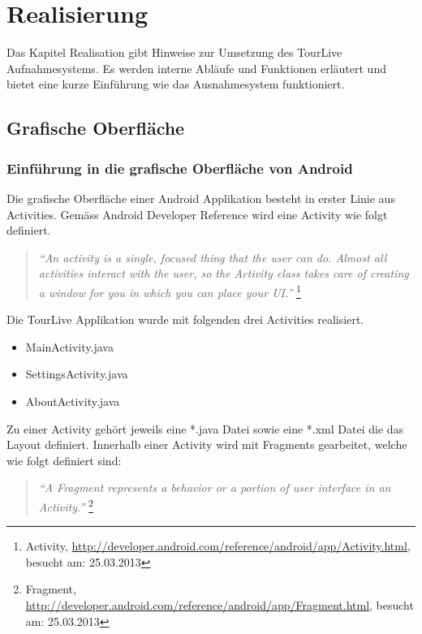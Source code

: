 \section{Realisierung}
Das Kapitel Realisation gibt Hinweise zur Umsetzung des TourLive Aufnahmesystems. Es werden interne Abläufe und Funktionen erläutert und bietet eine kurze Einführung wie das Ausnahmesystem funktioniert. 

\subsection{Grafische Oberfläche}
\subsubsection{Einführung in die grafische Oberfläche von Android}

Die grafische Oberfläche einer Android Applikation besteht in erster Linie aus Activities. Gemäss Android Developer Reference wird eine Activity wie folgt definiert.

\begin{quotation}
\textit{``An activity is a single, focused thing that the user can do. Almost all activities interact with the user, so the Activity class takes care of creating a window for you in which you can place your UI.''} \footnote{Activity, \url{http://developer.android.com/reference/android/app/Activity.html}, besucht am: 25.03.2013}
\end{quotation}

Die TourLive Applikation wurde mit folgenden drei Activities realisiert.
\begin{itemize} [noitemsep,topsep=0pt]
	\item MainActivity.java
	\item SettingsActivity.java
	\item AboutActivity.java
\end{itemize}

Zu einer Activity gehört jeweils eine *.java Datei sowie eine *.xml Datei die das Layout definiert. Innerhalb einer Activity wird mit Fragments gearbeitet, welche wie folgt definiert sind:

\begin{quotation}
\textit{``A Fragment represents a behavior or a portion of user interface in an Activity.''} \footnote{Fragment, \url{http://developer.android.com/reference/android/app/Fragment.html}, besucht am: 25.03.2013}
\end{quotation}

